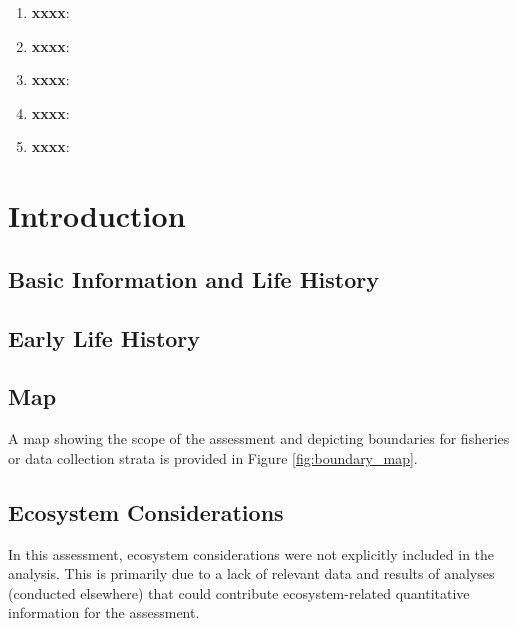 \documentclass[12pt,]{article}
\begin{document}
\begin{enumerate}

\item \textbf{xxxx}: 

\item \textbf{xxxx}:

\item \textbf{xxxx}:

\item \textbf{xxxx}:

\item \textbf{xxxx}:

\end{enumerate}

\FloatBarrier

\newpage

\renewcommand{\thefigure}{\arabic{figure}}
\renewcommand{\thetable}{\arabic{table}}

\setcounter{figure}{0} \setcounter{table}{0}


\section{Introduction}\label{introduction}

\subsection{Basic Information and Life
History}\label{basic-information-and-life-history}

\subsection{Early Life History}\label{early-life-history}

\subsection{Map}\label{map}

A map showing the scope of the assessment and depicting boundaries for
fisheries or data collection strata is provided in Figure
\ref{fig:boundary_map}.

\subsection{Ecosystem Considerations}\label{ecosystem-considerations-1}

In this assessment, ecosystem considerations were not explicitly
included in the analysis. This is primarily due to a lack of relevant
data and results of analyses (conducted elsewhere) that could contribute
ecosystem-related quantitative information for the assessment.
\end{document}
